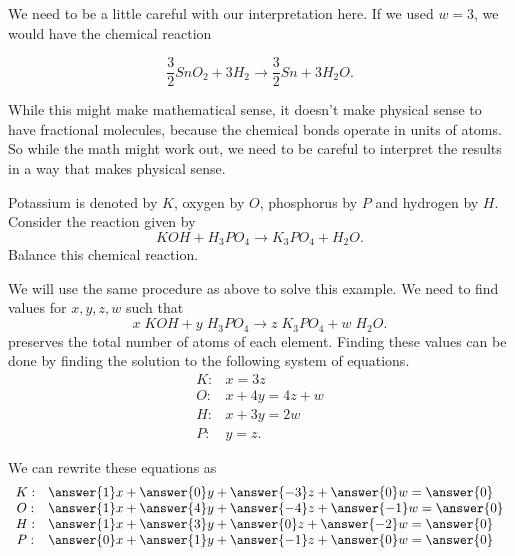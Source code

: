 \documentclass{ximera}
\begin{document}
\begin{exploration}
\begin{example}
\begin{remark}

  We need to be a little careful with our interpretation here. If we used $w=3$, we would have the chemical reaction

  \begin{equation*}
    \frac{3}{2}SnO_2+3H_2\rightarrow \frac{3}{2}Sn+3H_2O.
  \end{equation*}

  While this might make mathematical sense, it doesn't make physical sense to have fractional molecules, because the chemical bonds operate in units of atoms. So while the math might work out, we need to be careful to interpret the results in a way that makes physical sense.

\end{remark}

\end{example}


\begin{example}
  Potassium is denoted by $K$, oxygen by $O$, phosphorus by $P$ and
  hydrogen by $H$.  Consider the reaction given by
  \begin{equation*}
    KOH+H_3PO_4\rightarrow K_3PO_4+H_2O.
  \end{equation*}
  Balance this chemical reaction.


\begin{solution}
  We will use the same procedure as above to solve this example. We
  need to find values for $x,y,z,w$ such that
  \begin{equation*}
    x\;KOH+y\;H_3PO_4\rightarrow z\;K_3PO_4+w\;H_2O.
  \end{equation*}
  preserves the total number of atoms of each element.  Finding these
  values can be done by finding the solution to the following system
  of equations.
  \begin{equation*}
    \begin{array}{cl}
      K: & x=3z \\
      O: & x+4y=4z+w \\
      H: & x+3y=2w \\
      P: & y=z.
    \end{array}
  \end{equation*}
 
  We can rewrite these equations as
  \begin{equation*}
    \begin{array}{cl}
      K: & \answer{1}x + \answer{0}y + \answer{-3}z + \answer{0}w = \answer{0} \\
      O: & \answer{1}x + \answer{4}y + \answer{-4}z + \answer{-1}w = \answer{0} \\
      H: & \answer{1}x + \answer{3}y + \answer{0}z + \answer{-2}w = \answer{0} \\
      P: & \answer{0}x + \answer{1}y + \answer{-1}z + \answer{0}w = \answer{0}
    \end{array}
  \end{equation*}


\end{solution}
\end{example}
\end{exploration}
\end{document}
